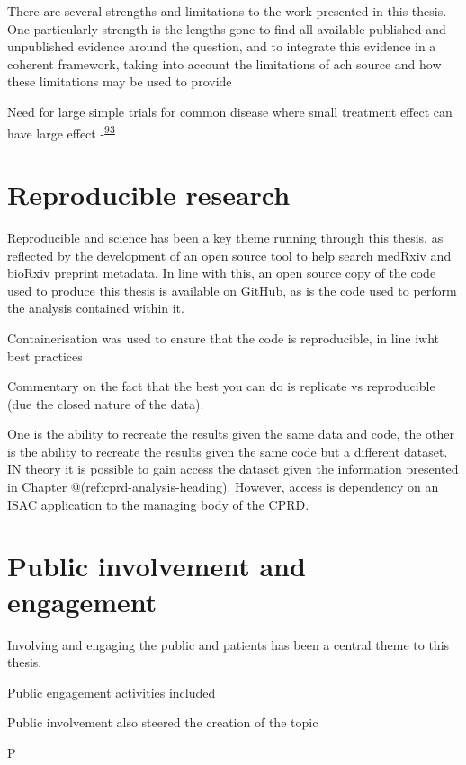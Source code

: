 \documentclass[a4paper, twoside]{templates/ociamthesis}
\begin{document}
There are several strengths and limitations to the work presented in this thesis. One particularly strength is the lengths gone to find all available published and unpublished evidence around the question, and to integrate this evidence in a coherent framework, taking into account the limitations of ach source and how these limitations may be used to provide

Need for large simple trials for common disease where small treatment effect can have large effect -\textsuperscript{\protect\hyperlink{ref-yusuf1984}{93}}

\hypertarget{reproducible-research}{%
\section{Reproducible research}\label{reproducible-research}}

Reproducible and science has been a key theme running through this thesis, as reflected by the development of an open source tool to help search medRxiv and bioRxiv preprint metadata. In line with this, an open source copy of the code used to produce this thesis is available on GitHub, as is the code used to perform the analysis contained within it.

Containerisation was used to ensure that the code is reproducible, in line iwht best practices

Commentary on the fact that the best you can do is replicate vs reproducible (due the closed nature of the data).

One is the ability to recreate the results given the same data and code, the other is the ability to recreate the results given the same code but a different dataset. IN theory it is possible to gain access the dataset given the information presented in Chapter @(ref:cprd-analysis-heading). However, access is dependency on an ISAC application to the managing body of the CPRD.

\hypertarget{disc-PPI}{%
\section{Public involvement and engagement}\label{disc-PPI}}

Involving and engaging the public and patients has been a central theme to this thesis.

Public engagement activities included

Public involvement also steered the creation of the topic

P
\end{document}
